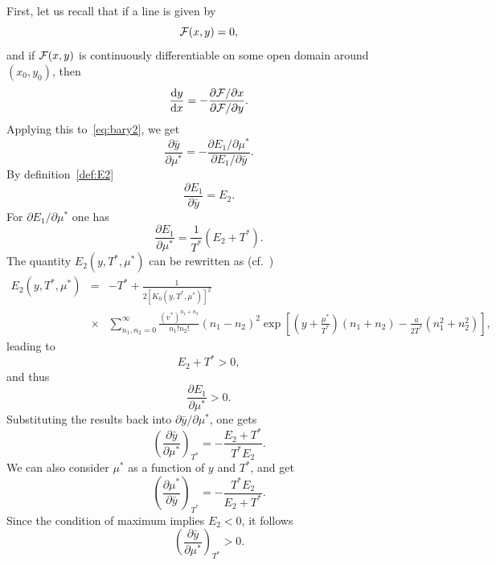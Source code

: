 \documentclass[12pt]{article}
\numberwithin{equation}{section}
\begin{document}
	First, let us recall that if a line is given by 
	\begin{equation*}
		{\cal F}(x,y) = 0,
	\end{equation*}
	and if ${\cal F}(x,y)$ is continuously differentiable on some open domain around $(x_0,y_0)$, then
	\begin{equation}
		\frac{{\rm d} y}{{\rm d} x} = - \frac{\partial {\cal F} / \partial x}{\partial {\cal F} / \partial y}.
	\end{equation}
	Applying this to~\eqref{eq:bary2}, we get
	\begin{equation}
		\frac{\partial \bar{y}}{\partial \mu^*} = - \frac{\partial E_1 / \partial \mu^*}{\partial E_1 / \partial \bar{y}}.
	\end{equation}
	By definition~\eqref{def:E2}
	\begin{equation}
		\frac{\partial E_1}{\partial \bar{y}} = E_2.
	\end{equation}
	For $\partial E_1 / \partial \mu^*$ one has
	\begin{equation}
		\frac{\partial E_1}{\partial \mu^*} = \frac{1}{T^*} (E_2 + T^*).
	\end{equation}
	The quantity $E_2(y,T^*,\mu^*)$ can be rewritten as (cf.~\cite[(2.23)]{KKD20})
	\begin{eqnarray}
		E_2(y,T^*,\mu^*) & = & -T^* + \frac{1}{2 [K_0(y,T^*,\mu^*)]^2}
		\\
		& \times & \sum_{n_1, n_2 = 0}^{\infty} \frac{(v^*)^{n_1+n_2}}{n_1!n_2!}(n_1 - n_2)^2 \exp[\left(y + \frac{\mu^*}{T^*}\right)(n_1 + n_2) - \frac{a}{2T^*}(n_1^2 + n_2^2)],\nonumber
	\end{eqnarray}
	leading to
	\begin{equation}
		E_2 + T^* > 0,
	\end{equation}
	and thus
	\begin{equation}
		\frac{\partial E_1}{\partial \mu^*} > 0.
	\end{equation}
	Substituting the results back into $\partial \bar{y}/\partial \mu^*$, one gets
	\begin{equation}
		\left(\frac{\partial \bar{y}}{\partial \mu^*} \right)_{T^*} = -\frac{E_2 + T^*}{T^* E_2}.
	\end{equation}
	We can also consider $\mu^*$ as a function of $y$ and $T^*$, and get
	\begin{equation}
		\left(\frac{\partial \mu^*}{\partial \bar{y}} \right)_{T^*} = -\frac{T^* E_2}{E_2 + T^*}.
	\end{equation}
	Since the condition of maximum implies $E_2 < 0$, it follows
	\begin{equation}
		\left(\frac{\partial \bar{y}}{\partial \mu^*} \right)_{T^*} > 0.
	\end{equation}
	
\end{document}
